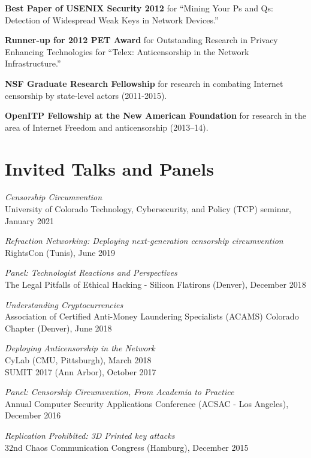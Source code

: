 \documentclass[margin,11pt]{res} %
\begin{document}
    \textbf{Best Paper of USENIX Security 2012}
    for ``Mining Your Ps and Qs: Detection of Widespread Weak Keys in Network Devices.''

    \textbf{Runner-up for 2012 PET Award} for Outstanding Research in Privacy Enhancing Technologies for ``Telex: Anticensorship in the Network Infrastructure.''


    \textbf{NSF Graduate Research Fellowship}
    for research in combating Internet censorship by state-level actors (2011-2015).
    
    \textbf{OpenITP Fellowship at the New American Foundation}
    for research in the area of Internet Freedom and anticensorship (2013--14).

\vspace{6pt}
\section{\large Invited Talks and Panels}

\emph{Censorship Circumvention} \\
    University of Colorado Technology, Cybersecurity, and Policy (TCP) seminar, January 2021

\emph{Refraction Networking: Deploying next-generation censorship circumvention} \\
    RightsCon (Tunis), June 2019

\emph{Panel: Technologist Reactions and Perspectives} \\
    The Legal Pitfalls of Ethical Hacking - Silicon Flatirons (Denver), December 2018

\emph{Understanding Cryptocurrencies} \\
    Association of Certified Anti-Money Laundering Specialists (ACAMS) Colorado Chapter (Denver), June 2018

\emph{Deploying Anticensorship in the Network} \\
    CyLab (CMU, Pittsburgh), March 2018 \\
    SUMIT 2017 (Ann Arbor), October 2017

\emph{Panel: Censorship Circumvention, From Academia to Practice} \\
    Annual Computer Security Applications Conference (ACSAC - Los Angeles), December 2016

\emph{Replication Prohibited: 3D Printed key attacks} \\
    32nd Chaos Communication Congress (Hamburg), December 2015
\end{document}
